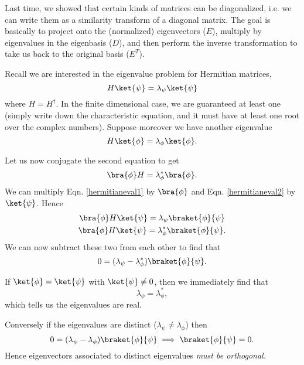 Last time, we showed that certain kinds of matrices can be diagonalized, i.e. we can write them as a similarity transform of a diagonal matrix. The goal is basically to project onto the (normalized) eigenvectors ($E$), multiply by eigenvalues in the eigenbasis ($D$), and then perform the inverse transformation to take us back to the original basis ($E^T$).

Recall we are interested in the eigenvalue problem for Hermitian matrices,
\begin{equation}\label{hermitianeval1}
    H\ket{\psi}= \lambda_\psi \ket{\psi}
\end{equation}
where $H=H^\dagger$. In the finite dimensional case, we are guaranteed at least one (simply write down the characteristic equation, and it must have at least one root over the complex numbers). Suppose moreover we have another eigenvalue
\begin{equation}
    H\ket{\phi}= \lambda_\phi \ket{\phi}.
\end{equation}

Let us now conjugate the second equation to get
\begin{equation}\label{hermitianeval2}
    \bra{\phi} H = \lambda_\phi^* \bra{\phi}.
\end{equation}
We can multiply Eqn. \ref{hermitianeval1} by $\bra{\phi}$ and Eqn. \ref{hermitianeval2} by $\ket{\psi}$. Hence
\begin{gather}
    \bra{\phi} H \ket{\psi} = \lambda_\psi \braket{\phi}{\psi}\\
    \bra{\phi} H \ket{\psi} = \lambda_\phi^* \braket{\phi}{\psi}.
\end{gather}
We can now subtract these two from each other to find that
\begin{equation}
    0 = (\lambda_\psi -\lambda_\phi^*) \braket{\phi}{\psi}.
\end{equation}

If $\ket{\phi}=\ket{\psi}$ with $\ket{\psi}\neq 0$, then we immediately find that
\begin{equation}
    \lambda_\phi = \lambda_\phi^*,
\end{equation}
which tells us the eigenvalues are real.

Conversely if the eigenvalues are distinct ($\lambda_\psi \neq \lambda_\phi$) then
\begin{equation}
    0 = (\lambda_\psi -\lambda_\phi) \braket{\phi}{\psi} \implies \braket{\phi}{\psi}=0.
\end{equation}
Hence eigenvectors associated to distinct eigenvalues \emph{must be orthogonal.}

